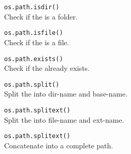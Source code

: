 \hangpar \texttt{os.path.isdir(}\texttt{)} \\
Check if the  is a folder.

\hangpar \texttt{os.path.isfile(}\texttt{)} \\
Check if the  is a file.

\hangpar \texttt{os.path.exists(}\texttt{)} \\
Check if the  already exists.

\hangpar \texttt{os.path.split(}\texttt{)} \\
Split the  into dir-name and base-name.

\hangpar \texttt{os.path.splitext(}\texttt{)} \\
Split the  into file-name and ext-name.

\hangpar \texttt{os.path.splitext(}\texttt{)} \\
Concatenate  into a complete path.
